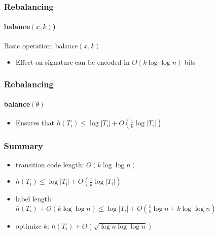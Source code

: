 \documentclass[aspectratio=169,xcolor=dvipsnames]{beamer}
\begin{document}
\begin{frame}
    \frametitle{Rebalancing}
    \framesubtitle{balance$(x,k)$)}

    Basic operation: balance$(x,k)$
    \begin{center}
    \end{center}
    \begin{itemize}
        \item<5->Effect on signature can be encoded in $O(k\log\log n)$ bits
    \end{itemize}
\end{frame}

\begin{frame}
    \frametitle{Rebalancing}
    \framesubtitle{balance$(\theta)$}

    \begin{center}
    \end{center}
    \begin{itemize}
        \item<11->Ensures that $h(T_i)\le \log|T_i| + O(\tfrac{1}{k}\log|T_i|)$
    \end{itemize}
\end{frame}

\begin{frame}
    \frametitle{Summary}
    \begin{itemize}[<+->]
        \item transition code length: $O(k\log\log n)$
        \item $h(T_i) \le \log|T_i| + O(\tfrac{1}{k}\log|T_i|)$
        \item label length: $h(T_i) + O(k\log\log n)\le \log|T_i| + O(\tfrac{1}{k}\log n + k\log\log n)$
        \item optimize $k$: $h(T_i) + O(\sqrt{\log n\log\log n})$
    \end{itemize}
\end{frame}
\end{document}
